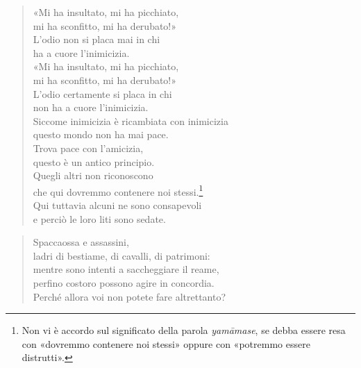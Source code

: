
\begin{quote}
«Mi ha insultato, mi ha picchiato, \\
mi ha sconfitto, mi ha derubato!» \\
L’odio non si placa mai in chi \\
ha a cuore l’inimicizia. \\
«Mi ha insultato, mi ha picchiato, \\
mi ha sconfitto, mi ha derubato!» \\
L’odio certamente si placa in chi \\
non ha a cuore l’inimicizia. \\
Siccome inimicizia è ricambiata con inimicizia \\
questo mondo non ha mai pace. \\
Trova pace con l’amicizia, \\
questo è un antico principio. \\
Quegli altri non riconoscono \\
che qui dovremmo contenere noi stessi.\footnote{Non vi è accordo sul significato della parola \emph{yamāmase}, se debba essere resa con «dovremmo contenere noi stessi» oppure con «potremmo essere distrutti».} \\
Qui tuttavia alcuni ne sono consapevoli \\
e perciò le loro liti sono sedate.
\end{quote}


\begin{quote}
Spaccaossa e assassini, \\
ladri di bestiame, di cavalli, di patrimoni: \\
mentre sono intenti a saccheggiare il reame, \\
perfino costoro possono agire in concordia. \\
Perché allora voi non potete fare altrettanto?
\end{quote}


